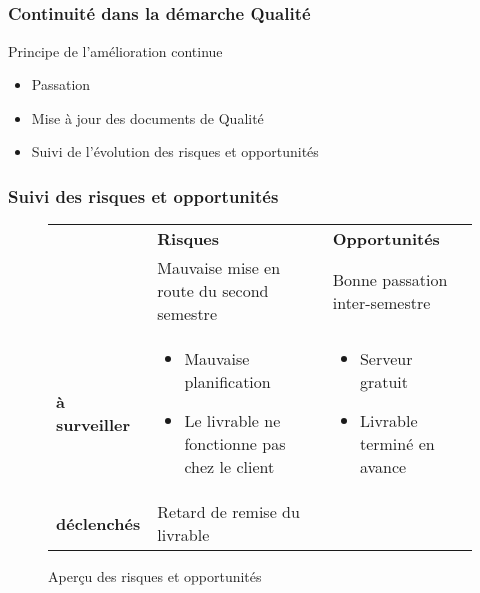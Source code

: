 
\speaker{\Kafui}

\subsection{} %


\begin{frame}
\frametitle{Continuité dans la démarche Qualité}
\begin{block}{Principe de l'amélioration continue}
\begin{itemize}
\item Passation 
\item Mise à jour des documents de Qualité
\item Suivi de l'évolution des risques et opportunités
\end{itemize}
\end{block}
\end{frame}




\begin{frame}
\frametitle{Suivi des risques et opportunités}
\begin{figure}
\color{black}
\begin{longtable}{|p{1.8cm}||p{3.5cm}|p{3.5cm}|}
\hline
 & \textbf{Risques} & \textbf{Opportunités} \\\hhline{|=||=|=|}
\multirow{1}{*}{\textbf{clôturés}} & \small Mauvaise mise en route du second semestre & \small Bonne passation inter-semestre \\\hline
\multirow{1}{*}{\textbf{à surveiller}} & \small \begin{itemize}
						\color{black}
						\item Mauvaise planification
						\item Le livrable ne fonctionne pas chez le client
						\end{itemize}& \begin{itemize}	
							\color{black}
							\item Serveur gratuit
							\item Livrable terminé en avance
							\end{itemize}	\\\hline
\multirow{1}{*}{\textbf{déclenchés}} & \small Retard de remise du livrable & \\\hline
\end{longtable}
\caption{Aperçu des risques et opportunités}
\end{figure}
\end{frame}



